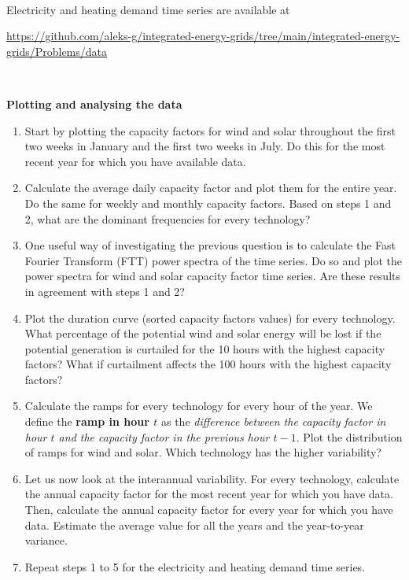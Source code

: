 \documentclass[10pt]{article}
\newenvironment{problem}[2][Problem]{\begin{trivlist}
\item[\hskip \labelsep {\bfseries #1}\hskip \labelsep {\bfseries #2.}]}{\end{trivlist}}
\begin{document}
\begin{problem}{1.1. Analysing solar and wind generation time series}
\

Electricity and heating demand time series are available at

\url{https://github.com/aleks-g/integrated-energy-grids/tree/main/integrated-energy-grids/Problems/data}

\

\textbf{Plotting and analysing the data}

\begin{enumerate}

\item Start by plotting the capacity factors for wind and solar throughout the first two weeks in January and the first two weeks in July. Do this for the most recent year for which you have available data.  

\item Calculate the average daily capacity factor and plot them for the entire year. Do the same for weekly and monthly capacity factors. Based on steps 1 and 2, what are the dominant frequencies for every technology?

\item One useful way of investigating the previous question is to calculate the Fast Fourier Transform (FTT) power spectra of the time series. Do so and plot the power spectra for wind and solar capacity factor time series. Are these results in agreement with steps 1 and 2?

\item Plot the duration curve (sorted capacity factors values) for every technology. What percentage of the potential wind and solar energy will be lost if the potential generation is curtailed for the 10 hours with the highest capacity factors? What if curtailment affects the 100 hours with the highest capacity factors?

\item Calculate the ramps for every technology for every hour of the year. We define the \textbf{ramp in hour $t$} as the \emph{difference between the capacity factor in hour $t$ and the capacity factor in the previous hour $t-1$}. Plot the distribution of ramps for wind and solar. Which technology has the higher variability?

\item Let us now look at the interannual variability. For every technology, calculate the annual capacity factor for the most recent year for which you have data. Then, calculate the annual capacity factor for every year for which you have data. Estimate the average value for all the years and the year-to-year variance.

\item Repeat steps 1 to 5 for the electricity and heating demand time series. 

\end{enumerate}

\end{problem}
\end{document}
